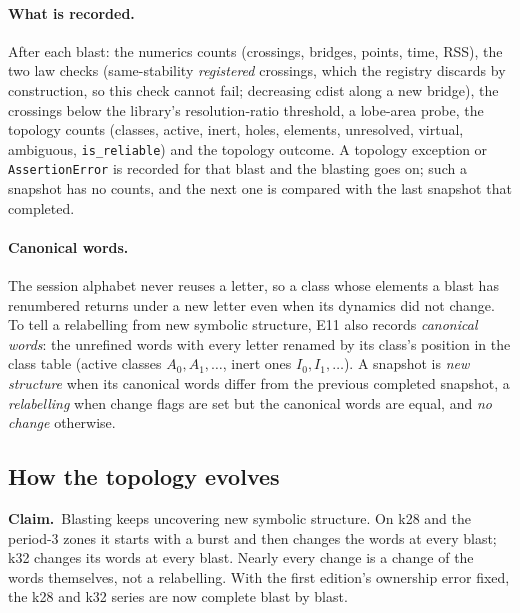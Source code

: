 \documentclass[11pt,a4paper]{article}
\newcommand{\claim}{\par\smallskip\noindent\textbf{Claim.}~}
\newcommand{\code}[1]{\texttt{#1}}
\begin{document}
\paragraph{What is recorded.} After each blast: the numerics counts
(crossings, bridges, points, time, RSS), the two law checks (same-stability
\emph{registered} crossings, which the registry discards by construction, so
this check cannot fail; decreasing cdist along a new bridge), the
crossings below the library's resolution-ratio threshold, a lobe-area probe, the
topology counts (classes, active, inert, holes, elements, unresolved,
virtual, ambiguous, \code{is\_reliable}) and the topology outcome. A
topology exception or \code{AssertionError} is recorded for that blast and
the blasting goes on; such a snapshot has no counts, and the next one is
compared with the last snapshot that completed.

\paragraph{Canonical words.} The session alphabet never reuses a letter, so
a class whose elements a blast has renumbered returns under a new letter
even when its dynamics did not change. To tell a relabelling from new
symbolic structure, E11 also records \emph{canonical words}: the unrefined
words with every letter renamed by its class's position in the class table
(active classes $A_0, A_1,\ldots$, inert ones $I_0, I_1,\ldots$). A snapshot
is \emph{new structure} when its canonical words differ from the previous
completed snapshot, a \emph{relabelling} when change flags are set but the
canonical words are equal, and \emph{no change} otherwise.

\subsection{How the topology evolves}
\label{sec:blastdepth-evolution}

\claim Blasting keeps uncovering new symbolic structure. On k28 and the
period-3 zones it starts with a burst and then changes the words at every
blast; k32 changes its words at every blast. Nearly every change is a change
of the words themselves, not a relabelling. With the first edition's
ownership error fixed, the k28 and k32 series are now complete blast by
blast.
\end{document}

